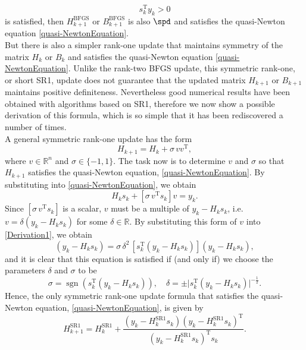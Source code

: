 \begin{equation}\label{CurvatureCondition}
    s^{\mathrm{T}}_k y_k > 0
\end{equation}
is satisfied, then $H^{\mathrm{BFGS}}_{k+1}$ or $B^{\mathrm{BFGS}}_{k+1}$ is also $\spd$ and satisfies the quasi-Newton equation \cref{quasi-NewtonEquation}. \\
But there is also a simpler rank-one update that maintains symmetry of the matrix $H_k$ or $B_k$ and satisfies the quasi-Newton equation \cref{quasi-NewtonEquation}. Unlike the rank-two BFGS update, this symmetric rank-one, or short SR1, update does not guarantee that the updated matrix $H_{k+1}$ or $B_{k+1}$ maintains positive definiteness. Nevertheless good numerical results have been obtained with algorithms based on SR1, therefore we now show a possible derivation of this formula, which is so simple that it has been rediscovered a number of times. \\
A general symmetric rank-one update has the form
\begin{equation*}
    H_{k+1} = H_k + \sigma \, v v^{\mathrm{T}},
\end{equation*}
where $v \in \mathbb{R}^n$ and $\sigma \in \{-1,1\}$. The task now is to determine $v$ and $\sigma$ so that $H_{k+1}$ satisfies the quasi-Newton equation, \cref{quasi-NewtonEquation}. By substituting into \cref{quasi-NewtonEquation}, we obtain
\begin{equation}\label{Derivation1}
    H_k s_k + [\sigma \, v^{\mathrm{T}} s_k] v = y_k.
\end{equation}
Since $[\sigma \, v^{\mathrm{T}} s_k]$ is a scalar, $v$ must be a multiple of $y_k − H_k s_k$, i.e. $v = \delta (y_k − H_k s_k)$ for some $\delta \in \mathbb{R}$. By substituting this form of $v$ into \cref{Derivation1}, we obtain
\begin{equation}\label{Derivation2}
    (y_k − H_k s_k) = \sigma \, \delta^2 \, [s^{\mathrm{T}}_k (y_k − H_k s_k)](y_k − H_k s_k),
\end{equation}
and it is clear that this equation is satisfied if (and only if) we choose the parameters $\delta$ and $\sigma$ to be
\begin{equation*}
    \sigma = \operatorname{sgn} (s^{\mathrm{T}}_k (y_k − H_k s_k)), \quad \delta = \pm \lvert s^{\mathrm{T}}_k (y_k − H_k s_k) \rvert^{-\frac{1}{2}}.
\end{equation*}
Hence, the only symmetric rank-one update formula that satisfies the quasi-Newton equation, \cref{quasi-NewtonEquation}, is given by
\begin{equation}\label{directSR1formula}
    H^\mathrm{SR1}_{k+1} = H^\mathrm{SR1}_k + \frac{(y_k - H^\mathrm{SR1}_k s_k) (y_k - H^\mathrm{SR1}_k s_k)^{\mathrm{T}}}{(y_k - H^\mathrm{SR1}_k s_k)^{\mathrm{T}} s_k}.
\end{equation}
